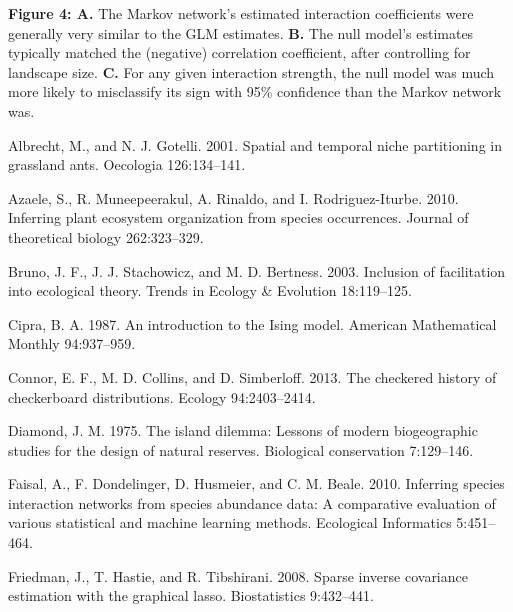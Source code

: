 \documentclass[12pt,]{article}
\begin{document}
\begin{spacing}{1.9}
\begin{flushleft}
\textbf{Figure 4: A.} The Markov network's estimated interaction
coefficients were generally very similar to the GLM estimates.
\textbf{B.} The null model's estimates typically matched the (negative)
correlation coefficient, after controlling for landscape size.
\textbf{C.} For any given interaction strength, the null model was much
more likely to misclassify its sign with 95\% confidence than the Markov
network was.

Albrecht, M., and N. J. Gotelli. 2001. Spatial and temporal niche
partitioning in grassland ants. Oecologia 126:134--141.

Azaele, S., R. Muneepeerakul, A. Rinaldo, and I. Rodriguez-Iturbe. 2010.
Inferring plant ecosystem organization from species occurrences. Journal
of theoretical biology 262:323--329.

Bruno, J. F., J. J. Stachowicz, and M. D. Bertness. 2003. Inclusion of
facilitation into ecological theory. Trends in Ecology \& Evolution
18:119--125.

Cipra, B. A. 1987. An introduction to the Ising model. American
Mathematical Monthly 94:937--959.

Connor, E. F., M. D. Collins, and D. Simberloff. 2013. The checkered
history of checkerboard distributions. Ecology 94:2403--2414.

Diamond, J. M. 1975. The island dilemma: Lessons of modern biogeographic
studies for the design of natural reserves. Biological conservation
7:129--146.

Faisal, A., F. Dondelinger, D. Husmeier, and C. M. Beale. 2010.
Inferring species interaction networks from species abundance data: A
comparative evaluation of various statistical and machine learning
methods. Ecological Informatics 5:451--464.

Friedman, J., T. Hastie, and R. Tibshirani. 2008. Sparse inverse
covariance estimation with the graphical lasso. Biostatistics
9:432--441.


\end{flushleft}
\end{spacing}
\end{document}
